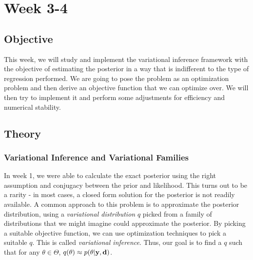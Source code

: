\section{Week 3-4}
\subsection{Objective}
This week, we will study and implement the variational inference framework with the objective of
estimating the posterior in a way that is indifferent to the type of regression performed.
We are going to pose the problem as an optimization problem and then derive an objective function that we can optimize over.
We will then try to implement it and perform some adjustments for efficiency and numerical stability.
\subsection{Theory}
\subsubsection{Variational Inference and Variational Families}
In week 1, we were able to calculate the exact posterior using the right assumption and conjugacy between the prior and likelihood.
This turns out to be a rarity - in most cases, a closed form solution for the posterior is not readily available.
A common approach to this problem is to approximate the posterior distribution, using a \textit{variational distribution} $q$ picked from a family of distributions 
that we might imagine could approximate the posterior.
By picking a suitable objective function, we can use optimization techniques to pick a suitable $q$.
This is called \textit{variational inference}. Thus, our goal is to find a $q$ such that for any $\theta\in \Theta$, $q(\theta) \approx p(\theta | \mathbf{y}, \mathbf{d})$.

